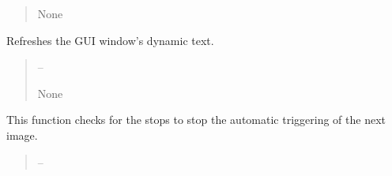 \documentclass[letterpaper,11pt,english]{sphinxmanual}
\begin{document}
\begin{savenotes}
\begin{fulllineitems}
\begin{savenotes}
\begin{fulllineitems}
\begin{quote}
\begin{description}
\sphinxAtStartPar
None

\end{description}\end{quote}

\end{fulllineitems}\end{savenotes}


\begin{savenotes}\begin{fulllineitems}
\label{\detokenize{code/opihiexarata.gui.automatic:opihiexarata.gui.automatic.OpihiAutomaticWindow.__refresh_dynamic_label_text}}
\pysigstartsignatures
{}
\pysigstopsignatures
\sphinxAtStartPar
Refreshes the GUI window’s dynamic text.
\begin{quote}\begin{description}
\sphinxAtStartPar
{} – 

\sphinxAtStartPar
None

\end{description}\end{quote}

\end{fulllineitems}\end{savenotes}


\begin{savenotes}\begin{fulllineitems}
\label{\detokenize{code/opihiexarata.gui.automatic:opihiexarata.gui.automatic.OpihiAutomaticWindow._automatic_triggering_check_stops}}
\pysigstartsignatures
{}
\pysigstopsignatures
\sphinxAtStartPar
This function checks for the stops to stop the automatic triggering
of the next image.
\begin{quote}\begin{description}
\sphinxAtStartPar
{} – 


\end{description}
\end{quote}
\end{fulllineitems}
\end{savenotes}
\end{fulllineitems}
\end{savenotes}
\end{document}
